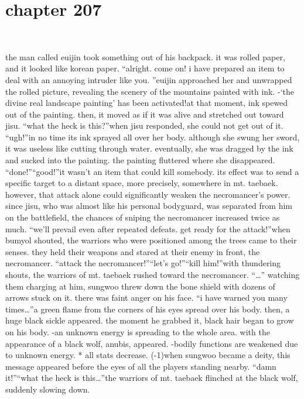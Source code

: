 \section{chapter 207}

                             




the man called euijin took something out of his backpack.
it was rolled paper, and it looked like korean paper.
“alright.
 come on! i have prepared an item to deal with an annoying intruder like you.
”euijin approached her and unwrapped the rolled picture, revealing the scenery of the mountains painted with ink.
-‘the divine real landscape painting’ has been activated!at that moment, ink spewed out of the painting.
 then, it moved as if it was alive and stretched out toward jisu.
“what the heck is this?”when jisu responded, she could not get out of it.
“ugh!”in no time its ink sprayed all over her body.
 although she swung her sword, it was useless like cutting through water.
 eventually, she was dragged by the ink and sucked into the painting.
 the painting fluttered where she disappeared.
“done!”“good!”it wasn’t an item that could kill somebody.
 its effect was to send a specific target to a distant space, more precisely, somewhere in mt.
 taebaek.
however, that attack alone could significantly weaken the necromancer’s power.
since jisu, who was almost like his personal bodyguard, was separated from him on the battlefield, the chances of sniping the necromancer increased twice as much.
“we’ll prevail even after repeated defeats.
 get ready for the attack!”when bumyol shouted, the warriors who were positioned among the trees came to their senses.
 they held their weapons and stared at their enemy in front, the necromancer.
“attack the necromancer!”“let’s go!”“kill him!”with thundering shouts, the warriors of mt.
 taebaek rushed toward the necromancer.
“…”
watching them charging at him, sungwoo threw down the bone shield with dozens of arrows stuck on it.
 there was faint anger on his face.
“i have warned you many times…”a green flame from the corners of his eyes spread over his body.
 then, a huge black sickle appeared.
 the moment he grabbed it, black hair began to grow on his body.
-an unknown energy is spreading to the whole area.
with the appearance of a black wolf, anubis, appeared.
-bodily functions are weakened due to unknown energy.
* all stats decrease.
 (-1)when sungwoo became a deity, this message appeared before the eyes of all the players standing nearby.
“damn it!”“what the heck is this…”the warriors of mt.
 taebaek flinched at the black wolf, suddenly slowing down.
